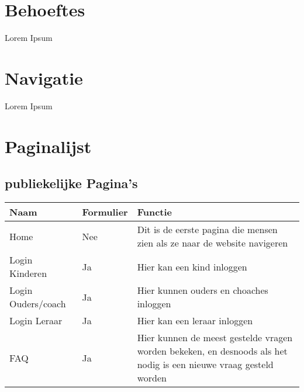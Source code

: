 \documentclass[]{report}
\begin{document}
\chapter{Behoeftes}

Lorem Ipsum




\chapter{Navigatie}

Lorem Ipsum




\chapter{Paginalijst}

\section{publiekelijke Pagina's}

\begin{tabular}{ l l p{6cm} }
	\textbf{Naam} & \textbf{Formulier} & \textbf{Functie} \\ \hline
	Home 				& Nee		& Dit is de eerste pagina die mensen zien als ze naar de website navigeren \\ 
	Login Kinderen 		& Ja		& Hier kan een kind inloggen \\
	Login Ouders/coach 	& Ja		& Hier kunnen ouders en choaches inloggen \\
	Login Leraar 		& Ja		& Hier kan een leraar inloggen \\
	FAQ 				& Ja 		& Hier kunnen de meest gestelde vragen worden bekeken, en desnoods als het nodig is een nieuwe vraag gesteld worden \\
\end{tabular}
\end{document}
